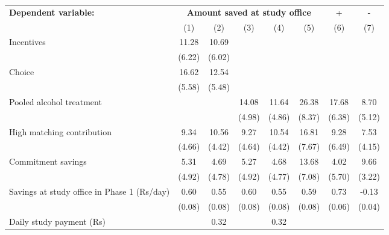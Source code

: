 \begin{tabular}{l c c c c c c c} \toprule \textbf{Dependent variable:} & \multicolumn{5}{c}{\textbf{Amount saved at study office}} & + & - \\ \cmidrule(lr){2-6} \cmidrule(lr){7-7} \cmidrule(lr){8-8}&\multicolumn{1}{c}{(1)}&\multicolumn{1}{c}{(2)}&\multicolumn{1}{c}{(3)}&\multicolumn{1}{c}{(4)}&\multicolumn{1}{c}{(5)}&\multicolumn{1}{c}{(6)}&\multicolumn{1}{c}{(7)}\\
\midrule
Incentives          &       11.28&       10.69&            &            &            &            &            \\
                    &      (6.22)&      (6.02)&            &            &            &            &            \\
\addlinespace
Choice              &       16.62&       12.54&            &            &            &            &            \\
                    &      (5.58)&      (5.48)&            &            &            &            &            \\
\addlinespace
Pooled alcohol treatment&            &            &       14.08&       11.64&       26.38&       17.68&        8.70\\
                    &            &            &      (4.98)&      (4.86)&      (8.37)&      (6.38)&      (5.12)\\
\addlinespace
High matching contribution&        9.34&       10.56&        9.27&       10.54&       16.81&        9.28&        7.53\\
                    &      (4.66)&      (4.42)&      (4.64)&      (4.42)&      (7.67)&      (6.49)&      (4.15)\\
\addlinespace
Commitment savings  &        5.31&        4.69&        5.27&        4.68&       13.68&        4.02&        9.66\\
                    &      (4.92)&      (4.78)&      (4.92)&      (4.77)&      (7.08)&      (5.70)&      (3.22)\\
\addlinespace
Savings at study office in Phase 1 (Rs/day)&        0.60&        0.55&        0.60&        0.55&        0.59&        0.73&       -0.13\\
                    &      (0.08)&      (0.08)&      (0.08)&      (0.08)&      (0.08)&      (0.06)&      (0.04)\\
\addlinespace
Daily study payment (Rs)&            &        0.32&            &        0.32&            &            &            \\

\end{tabular}

